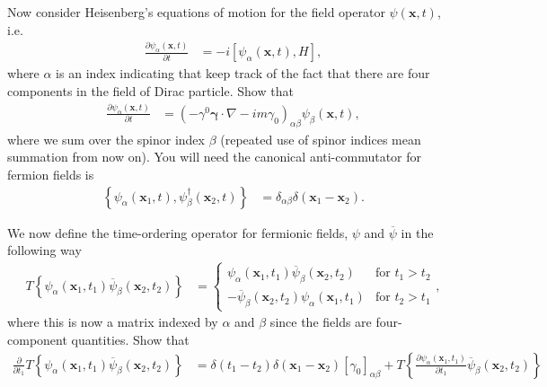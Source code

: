 \documentclass[working, oneside]{../../../Preambles/tuftebook}
\begin{document}
\begin{exercise}[2]
Now consider Heisenberg's equations of motion for the field operator \( \psi(\mathbf{x}, t) \), i.e.
\begin{align*}
\frac{\partial \psi_\alpha(\mathbf{x}, t)}{\partial t}
&= -i [\psi_\alpha(\mathbf{x}, t), H], \tag{26}
\end{align*}
where \( \alpha \) is an index indicating that keep track of the fact that there are four components in the field of Dirac particle. Show that
\begin{align*}
\frac{\partial \psi_\alpha(\mathbf{x}, t)}{\partial t}
&= \left( - \gamma^0 \boldsymbol{\gamma} \cdot \nabla - i m \gamma_0 \right)_{\alpha \beta} \psi_\beta(\mathbf{x}, t), \tag{27}
\end{align*}
where we sum over the spinor index \( \beta \) (repeated use of spinor indices mean summation from now on). You will need the canonical anti-commutator for fermion fields is
\begin{align*}
\left\{ \psi_\alpha(\mathbf{x}_1, t), \psi_\beta^\dagger(\mathbf{x}_2, t) \right\}
&= \delta_{\alpha \beta} \delta(\mathbf{x}_1 - \mathbf{x}_2). \tag{28}
\end{align*}
\end{exercise}
\begin{exercise}[3]
We now define the time-ordering operator for fermionic fields, \( \psi \) and \( \overline{\psi} \) in the following way
\begin{align*}
T \left\{ \psi_\alpha(\mathbf{x}_1, t_1) \overline{\psi}_\beta(\mathbf{x}_2, t_2) \right\}
&= \begin{cases} \psi_\alpha(\mathbf{x}_1, t_1) \overline{\psi}_\beta(\mathbf{x}_2, t_2) & \text{for } t_1 > t_2 \\ - \overline{\psi}_\beta(\mathbf{x}_2, t_2) \psi_\alpha(\mathbf{x}_1, t_1) & \text{for } t_2 > t_1 \end{cases}, \tag{29}
\end{align*}
where this is now a matrix indexed by \( \alpha \) and \( \beta \) since the fields are four-component quantities. Show that
\begin{align*}
\frac{\partial}{\partial t_1} T \left\{ \psi_\alpha(\mathbf{x}_1, t_1) \overline{\psi}_\beta(\mathbf{x}_2, t_2) \right\}
&= \delta(t_1 - t_2) \delta(\mathbf{x}_1 - \mathbf{x}_2) [\gamma_0]_{\alpha \beta} + T \left\{ \frac{\partial \psi_\alpha(\mathbf{x}_1, t_1)}{\partial t_1} \overline{\psi}_\beta(\mathbf{x}_2, t_2) \right\} \tag{30}
\end{align*}
\end{exercise}
\end{document}
